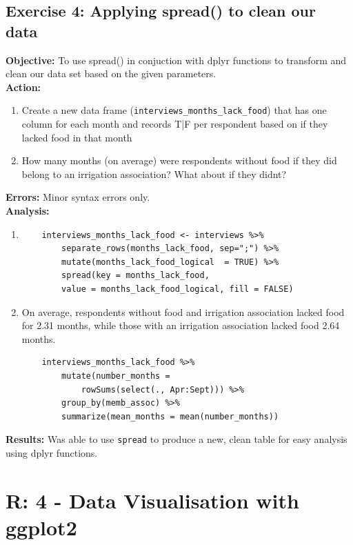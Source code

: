 \documentclass{article}
\begin{document}
\subsection{Exercise 4: Applying spread() to clean our data}
\textbf{Objective:} To use spread() in conjuction with dplyr functions to transform and clean our data set based on the given parameters.\\
\textbf{Action:}
\begin{enumerate}
    \item Create a new data frame (\verb|interviews_months_lack_food|) that has one column for each month and records T|F per respondent based on if they lacked food in that month
    \item How many months (on average) were respondents without food if they did belong to an irrigation association? What about if they didnt?
\end{enumerate}
\textbf{Errors:} Minor syntax errors only.\\
\textbf{Analysis:}
\begin{enumerate}
    \item 
    \begin{verbatim}
    interviews_months_lack_food <- interviews %>%
        separate_rows(months_lack_food, sep=";") %>%
        mutate(months_lack_food_logical  = TRUE) %>%
        spread(key = months_lack_food, 
        value = months_lack_food_logical, fill = FALSE)
    \end{verbatim}
    \item On average, respondents without food and irrigation association lacked food for 2.31 months, while those with an irrigation association lacked food 2.64 months.
    \begin{verbatim}
    interviews_months_lack_food %>%
        mutate(number_months =
            rowSums(select(., Apr:Sept))) %>%
        group_by(memb_assoc) %>%
        summarize(mean_months = mean(number_months))
    \end{verbatim}
\end{enumerate}
\textbf{Results:} Was able to use \verb|spread| to produce a new, clean table for easy analysis using dplyr functions.

\section{R: 4 - Data Visualisation with ggplot2}
\end{document}
